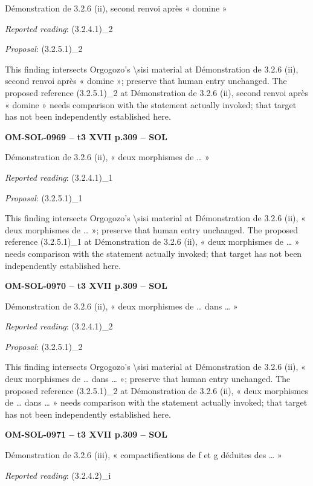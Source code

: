Démonstration de 3.2.6 (ii), second renvoi après « domine »\par
\emph{Reported reading}: (3.2.4.1)\_2\par
\emph{Proposal}: (3.2.5.1)\_2\par
This finding intersects Orgogozo's \textbackslash{}sisi material at Démonstration de 3.2.6 (ii), second renvoi après « domine »; preserve that human entry unchanged. The proposed reference (3.2.5.1)\_2 at Démonstration de 3.2.6 (ii), second renvoi après « domine » needs comparison with the statement actually invoked; that target has not been independently established here.\par
\par\noindent\textbf{OM-SOL-0969 -- t3 XVII p.309 -- SOL}\par
Démonstration de 3.2.6 (ii), « deux morphismes de … »\par
\emph{Reported reading}: (3.2.4.1)\_1\par
\emph{Proposal}: (3.2.5.1)\_1\par
This finding intersects Orgogozo's \textbackslash{}sisi material at Démonstration de 3.2.6 (ii), « deux morphismes de … »; preserve that human entry unchanged. The proposed reference (3.2.5.1)\_1 at Démonstration de 3.2.6 (ii), « deux morphismes de … » needs comparison with the statement actually invoked; that target has not been independently established here.\par
\par\noindent\textbf{OM-SOL-0970 -- t3 XVII p.309 -- SOL}\par
Démonstration de 3.2.6 (ii), « deux morphismes de … dans … »\par
\emph{Reported reading}: (3.2.4.1)\_2\par
\emph{Proposal}: (3.2.5.1)\_2\par
This finding intersects Orgogozo's \textbackslash{}sisi material at Démonstration de 3.2.6 (ii), « deux morphismes de … dans … »; preserve that human entry unchanged. The proposed reference (3.2.5.1)\_2 at Démonstration de 3.2.6 (ii), « deux morphismes de … dans … » needs comparison with the statement actually invoked; that target has not been independently established here.\par
\par\noindent\textbf{OM-SOL-0971 -- t3 XVII p.309 -- SOL}\par
Démonstration de 3.2.6 (iii), « compactifications de f et g déduites des … »\par
\emph{Reported reading}: (3.2.4.2)\_i\par
